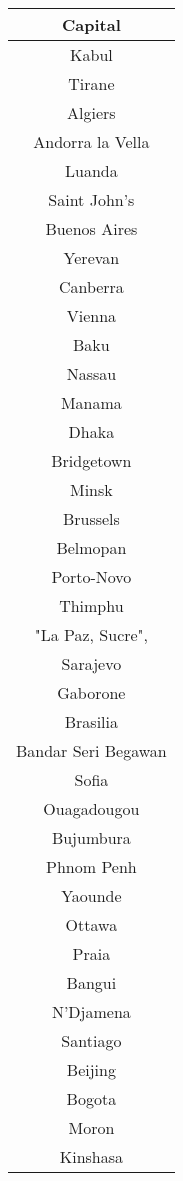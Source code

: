 \documentclass{article}
\begin{document}
\begin{center}
\begin{tabular} {|| c ||}
   Capital\\ \hline 
   Kabul\\ \hline 
   Tirane\\ \hline 
   Algiers\\ \hline 
   Andorra la Vella\\ \hline 
   Luanda\\ \hline 
   Saint John's\\ \hline 
   Buenos Aires\\ \hline 
   Yerevan\\ \hline 
   Canberra\\ \hline 
   Vienna\\ \hline 
   Baku\\ \hline 
   Nassau\\ \hline 
   Manama\\ \hline 
   Dhaka\\ \hline 
   Bridgetown\\ \hline 
   Minsk\\ \hline 
   Brussels\\ \hline 
   Belmopan\\ \hline 
   Porto-Novo\\ \hline 
   Thimphu\\ \hline 
   "La Paz, Sucre",\\ \hline 
   Sarajevo\\ \hline 
   Gaborone\\ \hline 
   Brasilia\\ \hline 
   Bandar Seri Begawan\\ \hline 
   Sofia\\ \hline 
   Ouagadougou\\ \hline 
   Bujumbura\\ \hline 
   Phnom Penh\\ \hline 
   Yaounde\\ \hline 
   Ottawa\\ \hline 
   Praia\\ \hline 
   Bangui\\ \hline 
   N'Djamena\\ \hline 
   Santiago\\ \hline 
   Beijing\\ \hline 
   Bogota\\ \hline 
   Moron\\ \hline 
   Kinshasa\\ \hline 

\end{tabular}
\end{center}
\end{document}
